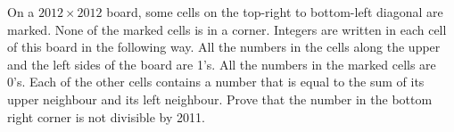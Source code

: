 On a $2012 \times 2012$ board, some cells on the top-right to bottom-left diagonal are marked.  None of the marked cells is in a corner.  Integers are written in each cell of this board in the following way.  All the numbers in the cells along the upper and the left sides of the board are 1's.  All the numbers in the marked cells are 0's.  Each of the other cells contains a number that is equal to the sum of its upper neighbour and its left neighbour.  Prove that the number in the bottom right corner is not divisible by 2011.